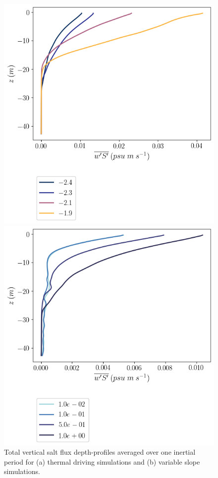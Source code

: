 \documentclass[draft,jgrga]{agutexSI2019}
\begin{document}
\begin{figure}[]
    \centering
    \begin{minipage}{0.5\textwidth}
        \includegraphics[trim={0 4cm 0 0},clip, width=\textwidth]{Figures/wsa_cmp_dT_43h_tav13_z_profile.png}
    \end{minipage}%
    \begin{minipage}{0.5\textwidth}
        \includegraphics[trim={0 4cm 0 0},clip, width=\textwidth]{Figures/wsa_cmp_dslope_43h_tav13_z_profile.png}
    \end{minipage}
    \caption{Total vertical salt flux depth-profiles averaged over one inertial period for (a) thermal driving simulations and (b) variable slope simulations.}
    \label{fig:saltflux}
\end{figure}%
\end{document}
